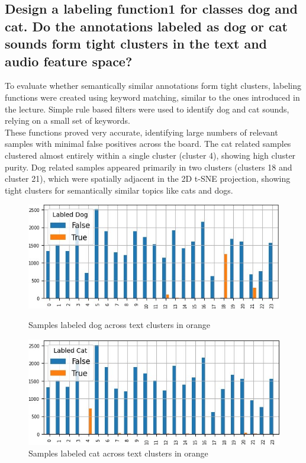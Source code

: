 \subsection{Design a labeling function1 for classes dog and cat. Do the annotations labeled as dog or cat sounds
form tight clusters in the text and audio feature space?}
\label{sec:Text Features:b}

To evaluate whether semantically similar annotations form tight clusters, labeling functions were created using keyword matching, similar to the ones introduced in the lecture. Simple rule based filters were used to identify dog and cat sounds, relying on a small set of keywords.\\
These functions proved very accurate, identifying large numbers of relevant samples with minimal false positives across the board. The cat related samples clustered almost entirely within a single cluster (cluster 4), showing high cluster purity. Dog related samples appeared primarily in two clusters (clusters 18 and cluster 21), which were spatially adjacent in the 2D t-SNE projection, showing tight clusters for semantically similar topics like cats and dogs.

\begin{figure}[h]
  \centering
  \begin{minipage}[b]{0.49\textwidth}
    \centering
    \includegraphics[width=\textwidth]{figs/dog_text_cluster.jpg}
    \caption{Samples labeled dog across text clusters in orange}
    \label{fig:image1}
  \end{minipage}
  \hfill
  \begin{minipage}[b]{0.49\textwidth}
    \centering
    \includegraphics[width=\textwidth]{figs/cat_text_cluster.jpg}
    \caption{Samples labeled cat across text clusters in orange}
    \label{fig:image2}
  \end{minipage}
\end{figure}


